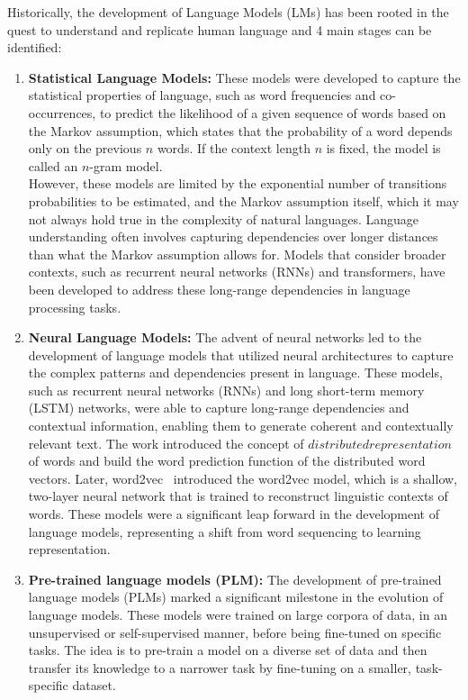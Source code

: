 Historically, the development of Language Models (LMs) has been rooted in the quest to understand and replicate human language and 4 main stages can be identified:
\begin{enumerate}
    \item \textbf{Statistical Language Models:} {These models were developed to capture the statistical properties of language, such as word frequencies and co-occurrences, to predict the likelihood of a given sequence of words based on the Markov assumption, which states that the probability of a word depends only on the previous $n$ words.
    If the context length $n$ is fixed, the model is called an $n$-gram model.\\
    However, these models are limited by the exponential number of transitions probabilities to be estimated, and the Markov assumption itself, which it may not always hold true in the complexity of natural languages.
    Language understanding often involves capturing dependencies over longer distances than what the Markov assumption allows for. Models that consider broader contexts, such as recurrent neural networks (RNNs) and transformers, have been developed to address these long-range dependencies in language processing tasks.}
    \item \textbf{Neural Language Models:} {The advent of neural networks led to the development of language models that utilized neural architectures to capture the complex patterns and dependencies present in language.
    These models, such as recurrent neural networks (RNNs) and long short-term memory (LSTM) networks, were able to capture long-range dependencies and contextual information, enabling them to generate coherent and contextually relevant text.
    The work \cite{nlm} introduced the concept of $distributed representation$ of words and build the word prediction function of the distributed word vectors.
    Later, word2vec~\cite{word2vec, word2vec2} introduced the word2vec model, which is a shallow, two-layer neural network that is trained to reconstruct linguistic contexts of words.
    These models were a significant leap forward in the development of language models, representing a shift from word sequencing to learning representation.}
    \item \textbf{Pre-trained language models (PLM):} {The development of pre-trained language models (PLMs) marked a significant milestone in the evolution of language models.
    These models were trained on large corpora of data, in an unsupervised or self-supervised manner, before being fine-tuned on specific tasks. The idea is to pre-train a model on a diverse set of data and then transfer its knowledge to a narrower task by fine-tuning on a smaller, task-specific dataset.
}
\end{enumerate}
